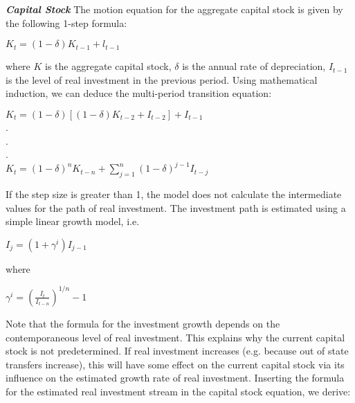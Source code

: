 \documentclass[12pt]{article}
\begin{document}
\textbf{\textit{Capital Stock}}
The motion equation for the aggregate capital stock is given by the following 1-step formula:

\begin{center}

$K_t = (1-\delta)K_{t-1}+l_{t-1}$

\end{center}

where $K$ is the aggregate capital stock, $\delta$ is the annual rate of depreciation, $I_{t-1}$ is the level of real investment in the previous period. Using mathematical induction, we can deduce the multi-period transition equation:

\begin{center}

$K_t = (1-\delta)[(1-\delta)K_{t-2}+I_{t-2}]+I_{t-1}$\\
.\\[-0.5em] %
.\\[-0.5em]
.\\
$K_t = (1-\delta)^nK_{t-n} + \displaystyle \sum^n_{j=1}(1-\delta)^{j-1}I_{t-j}$

\end{center}

If the step size is greater than 1, the model does not calculate the intermediate values for the path of real investment. The investment path is estimated using a simple linear growth model, i.e.

\begin{center}

$I_j = (1+\gamma^i)I_{j-1}$

\end{center}

where

\begin{center}

$\gamma^i = \left(\frac{I_t}{I_{t-n}}\right)^{1/n}-1$

\end{center}

Note that the formula for the investment growth depends on the contemporaneous level of real investment. This explains why the current capital stock is not predetermined. If real investment increases (e.g. because out of state transfers increase), this will have some effect on the current capital stock via its influence on the estimated growth rate of real investment. Inserting the formula for the estimated real investment stream in the capital stock equation, we derive:
\end{document}
